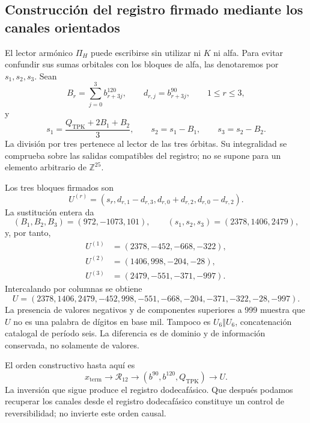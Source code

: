 \subsection{Construcción del registro firmado mediante los canales orientados}
\label{x_reciprocidad:subsec:k-pi-h}

El lector armónico \(\Pi_H\) puede escribirse sin utilizar ni \(K\) ni
alfa. Para evitar confundir sus sumas orbitales con los bloques de alfa,
las denotaremos por \(s_1,s_2,s_3\). Sean
\[
 B_r=\sum_{j=0}^{3}b^{120}_{r+3j},\qquad
 d_{r,j}=b^{90}_{r+3j},\qquad1\leq r\leq3,
\]
y
\begin{equation}
 s_1=\frac{Q_{\mathrm{TPK}}+2B_1+B_2}{3},\qquad
 s_2=s_1-B_1,\qquad s_3=s_2-B_2.
 \label{x_reciprocidad:eq:k-sumas-armonicas}
\end{equation}
La división por tres pertenece al lector de las tres órbitas. Su
integralidad se comprueba sobre las salidas compatibles del registro; no
se supone para un elemento arbitrario de \(\mathbb Z^{25}\).

Los tres bloques firmados son
\begin{equation}
 U^{(r)}=(s_r,d_{r,1}-d_{r,3},d_{r,0}+d_{r,2},d_{r,0}-d_{r,2}).
 \label{x_reciprocidad:eq:k-bloques-firmados}
\end{equation}
La sustitución entera da
\[
 (B_1,B_2,B_3)=(972,-1073,101),\qquad
 (s_1,s_2,s_3)=(2378,1406,2479),
\]
y, por tanto,
\begin{align*}
 U^{(1)}&=(2378,-452,-668,-322),\\
 U^{(2)}&=(1406,998,-204,-28),\\
 U^{(3)}&=(2479,-551,-371,-997).
\end{align*}
Intercalando por columnas se obtiene
\begin{equation}
 U=(2378,1406,2479,-452,998,-551,
       -668,-204,-371,-322,-28,-997).
 \label{x_reciprocidad:eq:k-u-firmado}
\end{equation}
La presencia de valores negativos y de componentes superiores a 999
muestra que \(U\) no es una palabra de dígitos en base mil. Tampoco es
\(U_6\Vert U_6\), concatenación catalogal de período seis. La diferencia
es de dominio y de información conservada, no solamente de valores.

El orden constructivo hasta aquí es
\[
 x_{\mathrm{term}}\longrightarrow\mathcal R_{12}
 \longrightarrow(b^{90},b^{120},Q_{\mathrm{TPK}})
 \longrightarrow U.
\]
La inversión que sigue produce el registro dodecafásico. Que después podamos recuperar
los canales desde el registro dodecafásico constituye un control de reversibilidad; no
invierte este orden causal.

